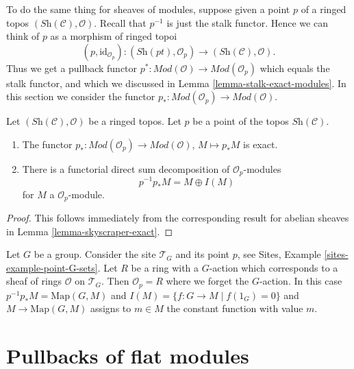 \noindent
To do the same thing for sheaves of modules, suppose given a point
$p$ of a ringed topos $(\textit{Sh}(\mathcal{C}), \mathcal{O})$.
Recall that $p^{-1}$ is just the stalk functor.
Hence we can think of $p$ as a morphism of ringed topoi
$$
(p, \text{id}_{\mathcal{O}_p}) :
(\textit{Sh}(pt), \mathcal{O}_p)
\longrightarrow
(\textit{Sh}(\mathcal{C}), \mathcal{O}).
$$
Thus we get a pullback functor
$p^* : \textit{Mod}(\mathcal{O}) \to \textit{Mod}(\mathcal{O}_p)$
which equals the stalk functor, and which we discussed in
Lemma \ref{lemma-stalk-exact-modules}.
In this section we consider the functor
$p_* : \textit{Mod}(\mathcal{O}_p) \to \textit{Mod}(\mathcal{O})$.

\begin{lemma}
\label{lemma-skyscraper-modules-exact}
Let $(\textit{Sh}(\mathcal{C}), \mathcal{O})$ be a ringed topos.
Let $p$ be a point of the topos $\textit{Sh}(\mathcal{C})$.
\begin{enumerate}
\item The functor
$p_* : \textit{Mod}(\mathcal{O}_p) \to \textit{Mod}(\mathcal{O})$,
$M \mapsto p_*M$ is exact.
\item There is a functorial direct sum decomposition of
$\mathcal{O}_p$-modules
$$
p^{-1}p_*M = M \oplus I(M)
$$
for $M$ a $\mathcal{O}_p$-module.
\end{enumerate}
\end{lemma}

\begin{proof}
This follows immediately from the corresponding result for abelian
sheaves in
Lemma \ref{lemma-skyscraper-exact}.
\end{proof}

\begin{example}
\label{example-ring-with-group-action}
Let $G$ be a group. Consider the site
$\mathcal{T}_G$ and its point $p$, see
Sites, Example \ref{sites-example-point-G-sets}.
Let $R$ be a ring with a $G$-action which corresponds to
a sheaf of rings $\mathcal{O}$ on $\mathcal{T}_G$.
Then $\mathcal{O}_p = R$ where we forget the $G$-action.
In this case $p^{-1}p_*M = \text{Map}(G, M)$ and
$I(M) = \{f : G \to M \mid f(1_G) = 0\}$ and
$M \to \text{Map}(G, M)$ assigns to $m \in M$ the constant
function with value $m$.
\end{example}




\section{Pullbacks of flat modules}
\label{section-pullback-flat}

